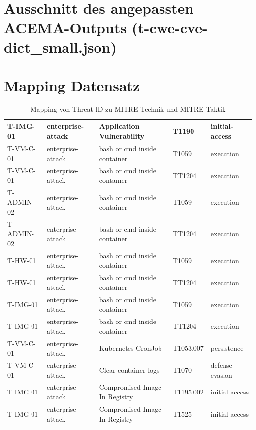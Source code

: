 \chapter{Ausschnitt des angepassten ACEMA-Outputs (t-cwe-cve-dict\_small.json)}

\restoregeometry

\chapter{Mapping Datensatz}
\label{app:mapping-dataset}
\begin{longtable}{|l|l|l|l|l|}
    \caption{Mapping von Threat-ID zu MITRE-Technik und MITRE-Taktik}\\
    \hline
    T-IMG-01 & enterprise-attack & Application Vulnerability & T1190 & initial-access \\ \hline
    T-VM-C-01 & enterprise-attack & bash or cmd inside container & T1059 & execution \\ \hline
    T-VM-C-01 & enterprise-attack & bash or cmd inside container & TT1204 & execution \\ \hline
    T-ADMIN-02 & enterprise-attack & bash or cmd inside container & T1059 & execution \\ \hline
    T-ADMIN-02 & enterprise-attack & bash or cmd inside container & TT1204 & execution \\ \hline
    T-HW-01 & enterprise-attack & bash or cmd inside container & T1059 & execution \\ \hline
    T-HW-01 & enterprise-attack & bash or cmd inside container & TT1204 & execution \\ \hline
    T-IMG-01 & enterprise-attack & bash or cmd inside container & T1059 & execution \\ \hline
    T-IMG-01 & enterprise-attack & bash or cmd inside container & TT1204 & execution \\ \hline
    T-VM-C-01 & enterprise-attack & Kubernetes CronJob & T1053.007 & persistence \\ \hline
    T-VM-C-01 & enterprise-attack & Clear container logs & T1070 & defense-evasion \\ \hline
    T-IMG-01 & enterprise-attack & Compromised Image In Registry & T1195.002 & initial-access \\ \hline
    T-IMG-01 & enterprise-attack & Compromised Image In Registry & T1525 & initial-access \\ \hline

\end{longtable}
